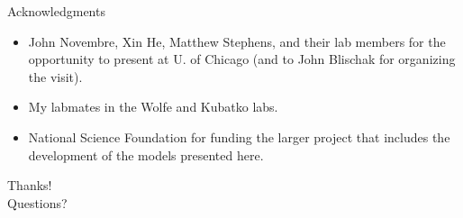 \documentclass[presentation,sansserif,12pt]{beamer}
\begin{document}
\begin{frame}[t,plain]{Acknowledgments}
  \vspace{0.2in}

  \begin{itemize}
    \setlength\itemsep{0.3in}
    \item John Novembre, Xin He, Matthew Stephens, and their lab members for the opportunity to present at U. of Chicago (and to John Blischak for organizing the visit).
    \item My labmates in the Wolfe and Kubatko labs.
    \item National Science Foundation for funding the larger project that includes the development of the models presented here.
  \end{itemize}

\end{frame}

\begin{frame}[c,plain]{}
	\begin{center}
		{\Huge Thanks!}\\
		\vspace{0.5in}
		{\LARGE Questions?}
	\end{center}
\end{frame}
\end{document}
